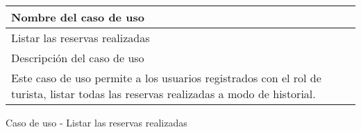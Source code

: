 \begin{identificacionCasoDeUso}
	\begin{tabular} { | p{17cm} |}

		\hline
		Nombre del caso de uso                                                                                                               \\ \hline
		Listar las reservas realizadas                                                                                                       \\ \hline
		Descripción del caso de uso                                                                                                          \\ \hline
		Este caso de uso permite a los usuarios registrados con el rol de turista, listar todas las reservas realizadas a modo de historial. \\ \hline
	\end{tabular}
	\caption{Caso de uso - Listar las reservas realizadas}
\end{identificacionCasoDeUso}